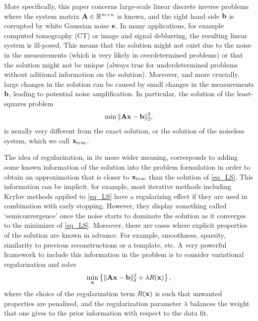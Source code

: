 \documentclass[11pt]{article}
\numberwithin{equation}{section}
\newcommand{\bfA}{{\bf A}}
\newcommand{\bfb}{{\bf b}}
\newcommand{\bfe}{{\bf e}}
\newcommand{\bfx}{{\bf x}}
\begin{document}
More specifically, this paper concerns large-scale linear discrete inverse problems where the system matrix $\bfA\in \mathbb{R}^{m \times n}$ is known, and the right hand side $\bfb$ is corrupted by white Gaussian noise $\bfe$. In many applications, for example computed tomography (CT) or image and signal deblurring, the resulting linear system is ill-posed. This means that the solution might not exist due to the noise in the measurements (which is very likely in overdetermined problems) or that the solution might not be unique (always true for underdetermined problems without aditional information on the solution). Moreover, and more crucially, large changes in the  solution can be caused by small changes in the measurements $\bfb$, leading to potential noise amplification. In particular, the solution of the least-squares problem %
\begin{equation}\label{eq_LS}
   \min \| \bfA \bfx - \bfb \|_2^2,
\end{equation}
is usually very different from the exact solution, or the solution of the noiseless system, which we call $\bfx_{\text{true}}$. 

The idea of regularization, in its more wider meaning, corresponds to adding some known information of the solution into the problem formulation in order to obtain an approximation that is closer to $\bfx_{\text{true}}$ than the solution of \eqref{eq_LS}. This information can be implicit, for example, most iterative methods including Krylov methods applied to \eqref{eq_LS} have a regularizing effect if they are used in combination with early stopping. However, they display something called `semiconvergence' once the noise starts to dominate the solution as it converges to the minimizer of \eqref{eq_LS}. Moreover, there are cases where explicit properties of the solution are known in advance. For example, smoothness, sparsity, similarity to previous reconstructions or a template, etc. A very powerful framework to include this information in the problem is to consider variational regularization and solve
\begin{equation}\label{eq:var}
   \min_\bfx \left\{\| \bfA \bfx - \bfb \|_2^2 + \lambda R(\bfx)\right\},
\end{equation}
where the choice of the regularization term $R(\bfx)$ is such that unwanted properties are penalized, and the regularization parameter $\lambda$ balances the weight that one gives to the prior information with respect to the data fit.
\end{document}
